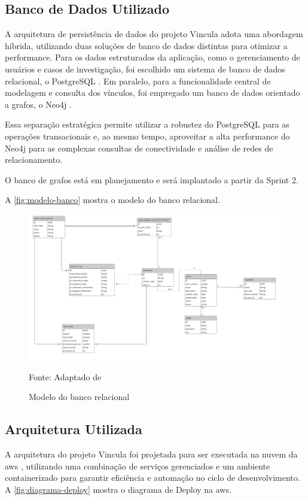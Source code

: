 \subsection{Banco de Dados Utilizado}
  A arquitetura de persistência de dados do projeto Vincula adota uma abordagem híbrida, utilizando duas soluções de banco de dados distintas para otimizar a performance. Para os dados estruturados da aplicação, como o gerenciamento de usuários e casos de investigação, foi escolhido um sistema de banco de dados relacional, o PostgreSQL \cite{postgresql}. Em paralelo, para a funcionalidade central de modelagem e consulta dos vínculos, foi empregado um banco de dados orientado a grafos, o Neo4j \cite{neo4j}.

  Essa separação estratégica permite utilizar a robustez do PostgreSQL para as operações transacionais e, ao mesmo tempo, aproveitar a alta performance do Neo4j para as complexas consultas de conectividade e análise de redes de relacionamento.
  
  O banco de grafos está em planejamento e será implantado a partir da Sprint 2.

  A \autoref{fig:modelo-banco} mostra o modelo do banco relacional.

  \begin{figure}[H]
    \centering
    \small
    \includegraphics[width=1\linewidth]{conteudo//2 - ages I//conteudo//figures//banco-postgresql.jpeg}
    \caption{Modelo do banco relacional}
    Fonte: Adaptado de \textcites{wiki-vincula}
    \label{fig:modelo-banco}
  \end{figure}

\newpage
\subsection{Arquitetura Utilizada}
  A arquitetura do projeto Vincula foi projetada para ser executada na nuvem da \ac{aws} \cite{aws}, utilizando uma combinação de serviços gerenciados e um ambiente containerizado para garantir eficiência e automação no ciclo de desenvolvimento. A \autoref{fig:diagrama-deploy} mostra o diagrama de Deploy na \acs{aws}.

